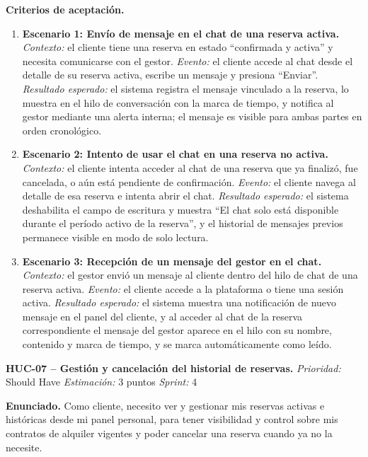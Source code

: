 \textbf{Criterios de aceptación.}
\begin{enumerate}
\item \textbf{Escenario 1: Envío de mensaje en el chat de una reserva activa.} \textit{Contexto:} el cliente tiene una reserva en estado ``confirmada y activa'' y necesita comunicarse con el gestor. \textit{Evento:} el cliente accede al chat desde el detalle de su reserva activa, escribe un mensaje y presiona ``Enviar''. \textit{Resultado esperado:} el sistema registra el mensaje vinculado a la reserva, lo muestra en el hilo de conversación con la marca de tiempo, y notifica al gestor mediante una alerta interna; el mensaje es visible para ambas partes en orden cronológico.
\item \textbf{Escenario 2: Intento de usar el chat en una reserva no activa.} \textit{Contexto:} el cliente intenta acceder al chat de una reserva que ya finalizó, fue cancelada, o aún está pendiente de confirmación. \textit{Evento:} el cliente navega al detalle de esa reserva e intenta abrir el chat. \textit{Resultado esperado:} el sistema deshabilita el campo de escritura y muestra ``El chat solo está disponible durante el período activo de la reserva'', y el historial de mensajes previos permanece visible en modo de solo lectura.
\item \textbf{Escenario 3: Recepción de un mensaje del gestor en el chat.} \textit{Contexto:} el gestor envió un mensaje al cliente dentro del hilo de chat de una reserva activa. \textit{Evento:} el cliente accede a la plataforma o tiene una sesión activa. \textit{Resultado esperado:} el sistema muestra una notificación de nuevo mensaje en el panel del cliente, y al acceder al chat de la reserva correspondiente el mensaje del gestor aparece en el hilo con su nombre, contenido y marca de tiempo, y se marca automáticamente como leído.
\end{enumerate}

\textbf{HUC-07 -- Gestión y cancelación del historial de reservas.} \label{req:HUC-07}
\textit{Prioridad:} Should Have \quad \textit{Estimación:} 3 puntos \quad \textit{Sprint:} 4

\textbf{Enunciado.} Como cliente, necesito ver y gestionar mis reservas activas e históricas desde mi panel personal, para tener visibilidad y control sobre mis contratos de alquiler vigentes y poder cancelar una reserva cuando ya no la necesite.

